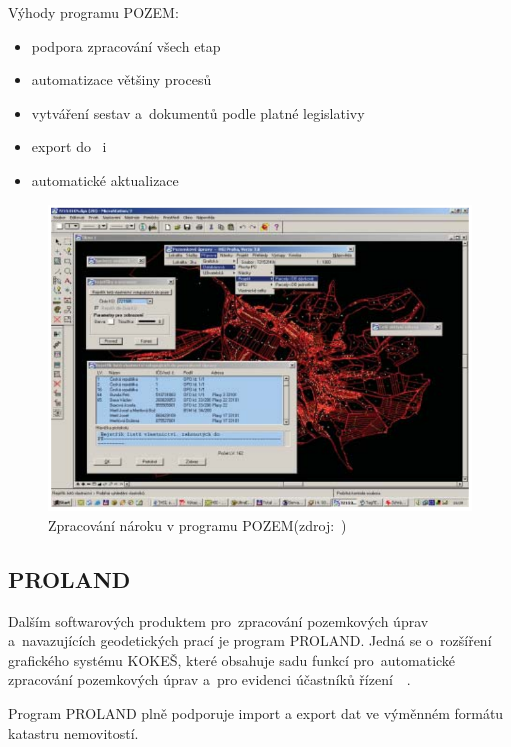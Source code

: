 Výhody programu POZEM:
	\begin{itemize}[leftmargin=1.5cm, noitemsep]
		\item podpora zpracování všech etap 
		\item automatizace většiny procesů 
		\item vytváření sestav a~dokumentů podle platné legislativy
		\item export do~ i~
		\item automatické aktualizace
	\end{itemize}

	\begin{figure}[H]
		\centering
		\includegraphics[width=.8\textwidth]{./pictures/pozem.png}
		\caption[Zpracování nároku v programu POZEM]{Zpracování nároku v programu POZEM(zdroj:~\cite{pozem})}
		\label{fig:pozem_obrazek}
 	\end{figure}

\subsection{PROLAND}
\label{proland}

Dalším softwarových produktem pro~zpracování pozemkových úprav a~navazujících geodetických prací je program PROLAND. Jedná se o~rozšíření grafického systému KOKEŠ, které obsahuje sadu funkcí pro~automatické zpracování pozemkových úprav a~pro evidenci účastníků řízení~\citep{proland}~\citep{pu_skripta}.

Program PROLAND plně podporuje import a export dat ve výměnném formátu katastru nemovitostí.


